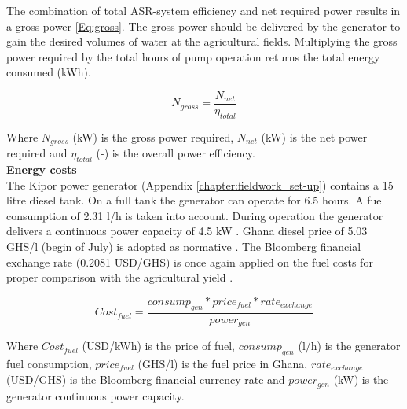 The combination of total ASR-system efficiency and net required power results in a gross power \ref{Eq:gross}. The gross power should be delivered by the generator to gain the desired volumes of water at the agricultural fields. Multiplying the gross power required by the total hours of pump operation returns the total energy consumed (kWh).

\begin{equation}
 N_{gross} =   \frac{N_{net}}{\eta_{total}}
\label{Eq:gross}
\end{equation}

Where $N_{gross}$ (kW) is the gross power required, $N_{net}$ (kW) is the net power required and $\eta_{total}$ (-) is the overall power efficiency. \\

\textbf{Energy costs} \\
The Kipor power generator (Appendix \ref{chapter:fieldwork_set-up}) contains a 15 litre diesel tank. On a full tank the generator can operate for 6.5 hours. A fuel consumption of 2.31 l/h is taken into account. During operation the generator delivers a continuous power capacity of 4.5 kW \citep{TS242018}. Ghana diesel price of 5.03 GHS/l (begin of July) is adopted as normative \citep{GlobalPetrolPrices2018}. The Bloomberg financial exchange rate (0.2081 USD/GHS) is once again applied on the fuel costs for proper comparison with the agricultural yield \citep{Bloomberg2018}.

\begin{equation}
 Cost_{fuel} =  \frac{consump_{gen} * price_{fuel} * rate_{exchange}}{power_{gen}}
\end{equation}

Where $Cost_{fuel}$ (USD/kWh) is the price of fuel,  $consump_{gen}$ (l/h) is the generator fuel consumption,  $price_{fuel}$ (GHS/l) is the fuel price in Ghana, $rate_{exchange}$ (USD/GHS) is the Bloomberg financial currency rate and $power_{gen}$ (kW) is the generator continuous power capacity. 


